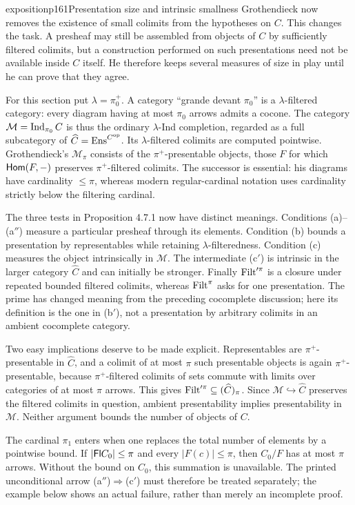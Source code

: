 \begin{dcomment}{exposition}{p161}{Presentation size and intrinsic smallness}
Grothendieck now removes the existence of small colimits from the hypotheses on $C$. This changes the task. A presheaf may still be assembled from objects of $C$ by sufficiently filtered colimits, but a construction performed on such presentations need not be available inside $C$ itself. He therefore keeps several measures of size in play until he can prove that they agree.

For this section put $\lambda=\pi_0^+$. A category ``grande devant $\pi_0$'' is a $\lambda$-filtered category: every diagram having at most $\pi_0$ arrows admits a cocone. The category $\mathcal M=\operatorname{Ind}_{\pi_0}C$ is thus the ordinary $\lambda$-Ind completion, regarded as a full subcategory of $\widehat C=\mathrm{Ens}^{C^{\mathrm{op}}}$. Its $\lambda$-filtered colimits are computed pointwise. Grothendieck's $\mathcal M_\pi$ consists of the $\pi^+$-presentable objects, those $F$ for which $\mathsf{Hom}(F,-)$ preserves $\pi^+$-filtered colimits. The successor is essential: his diagrams have cardinality $\leq\pi$, whereas modern regular-cardinal notation uses cardinality strictly below the filtering cardinal.

The three tests in Proposition 4.7.1 now have distinct meanings. Conditions (a)--(a$''$) measure a particular presheaf through its elements. Condition (b) bounds a presentation by representables while retaining $\lambda$-filteredness. Condition (c) measures the object intrinsically in $\mathcal M$. The intermediate (c$'$) is intrinsic in the larger category $\widehat C$ and can initially be stronger. Finally $\mathrm{Filt}'^\pi$ is a closure under repeated bounded filtered colimits, whereas $\mathrm{Filt}^\pi$ asks for one presentation. The prime has changed meaning from the preceding cocomplete discussion; here its definition is the one in (b$'$), not a presentation by arbitrary colimits in an ambient cocomplete category.

Two easy implications deserve to be made explicit. Representables are $\pi^+$-presentable in $\widehat C$, and a colimit of at most $\pi$ such presentable objects is again $\pi^+$-presentable, because $\pi^+$-filtered colimits of sets commute with limits over categories of at most $\pi$ arrows. This gives $\mathrm{Filt}'^\pi\subseteq(\widehat C)_\pi$. Since $\mathcal M\hookrightarrow\widehat C$ preserves the filtered colimits in question, ambient presentability implies presentability in $\mathcal M$. Neither argument bounds the number of objects of $C$.

The cardinal $\pi_1$ enters when one replaces the total number of elements by a pointwise bound. If $|\mathsf{Fl} C_0|\leq\pi$ and every $|F(c)|\leq\pi$, then $C_0/F$ has at most $\pi$ arrows. Without the bound on $C_0$, this summation is unavailable. The printed unconditional arrow (a$''$)$\Rightarrow$(c$'$) must therefore be treated separately; the example below shows an actual failure, rather than merely an incomplete proof.
\end{dcomment}


